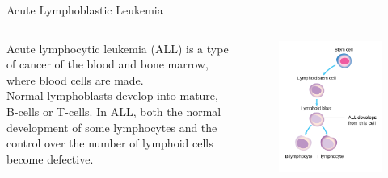 \documentclass{beamer}
\begin{document}
    \begin{frame}[label=all]{Acute Lymphoblastic Leukemia}
      \begin{columns}
        \begin{column}{0.5\textwidth}
          Acute lymphocytic leukemia (ALL) is a type of cancer 
          of the blood and bone marrow, where blood cells are made. \\
           Normal lymphoblasts develop into mature, B-cells or T-cells.
           In ALL, both the normal development of some 
           lymphocytes and the control over the number of 
           lymphoid cells become defective.
        \end{column}
        \begin{column}{0.4\textwidth}
          \begin{figure}
            \includegraphics[width=\textwidth]{resources/all.png}
          \end{figure}
        \end{column}
      \end{columns}
    \end{frame}
\end{document}
